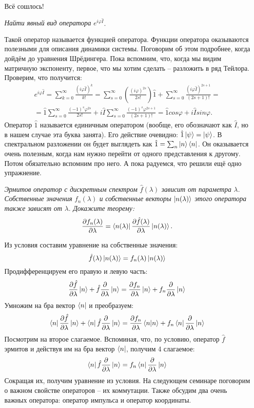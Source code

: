 Всё сошлось!
\newpage
{}
\begin{center}
\textit{Найти явный вид оператора $e^{i\varphi\hat I}$}.
\end{center}
Такой оператор называется функцией оператора. Функции оператора оказываются полезными для описания динамики системы. Поговорим об этом подробнее, когда дойдём до уравнения Шрёдингера. Пока вспомним, что, когда мы видим матричную экспоненту, первое, что мы хотим сделать -- разложить в ряд Тейлора. Проверим, что получится:
\begin{gather*}
    e^{i\varphi\hat I} = \sum\limits_{k=0}^{\infty} \frac{(i\varphi\hat I)^k}{k!} = \sum\limits_{s=0}^{\infty} \left(\frac{(i\varphi)^{2s}}{2s!}\right) \hat 1 + \sum\limits_{s=0}^{\infty} \frac{(i\varphi\hat I)^{2s+1}}{(2s+1)!} = \\
    =\hat 1 \sum\limits_{s=0}^{\infty} \frac{(-1)^s\varphi^{2s}}{2s!} + i\hat I \sum\limits_{s=0}^{\infty} \frac{(-1)^{s}\varphi^{2s+1}}{(2s+1)!} = \hat 1 cos\varphi + i\hat I sin \varphi.
\end{gather*}
Оператор $\hat{1}$ называется единичным оператором (вообще, его обозначают как $\hat{I}$, но в нашем случае эта буква занята). Его действие очевидно: $\hat{1}\ket{\psi} = \ket{\psi}$. В спектральном разложении он будет выглядеть как $\hat{1} = \sum_n \ket{n}\bra{n}$. Он оказывается очень полезным, когда нам нужно перейти от одного представления к другому. Потом обязательно вспомним про него. А пока радуемся, что решили ещё одно упражнение.
\begin{center}
\textit{Эрмитов оператор с дискретным спектром $\hat f(\lambda)$ зависит от параметра $\lambda$. Собственные значения $f_n(\lambda)$ и собственные векторы $\ket{n(\lambda)}$ этого оператора также зависят от $\lambda$. Докажите теорему:}
\[
\frac{\partial f_n(\lambda)}{\partial \lambda} = \bra{n(\lambda)} \frac{\partial \hat f(\lambda)}{\partial \lambda} \ket{n(\lambda)}.
\]
\end{center}

Из условия составим уравнение на собственные значения:
\[
\hat f(\lambda)\ket{n(\lambda)} = f_n(\lambda)\ket{n(\lambda)}
\]
Продифференцируем его правую и левую часть:
\[
\frac{\partial \hat f}{\partial \lambda}\ket{n} + \hat f\frac{\partial}{\partial \lambda}\ket{n} = \frac{\partial f_n}{\partial \lambda}\ket{n} + f_n\frac{\partial}{\partial \lambda}\ket{n}
\]
Умножим на бра вектор $\bra{n}$ и преобразуем:
\[
\bra{n}\frac{\partial \hat f}{\partial \lambda}\ket{n} + \bra{n}\hat f\frac{\partial}{\partial \lambda}\ket{n} = \frac{\partial f_n}{\partial \lambda}\braket{n} + f_n\bra{n}\frac{\partial}{\partial \lambda}\ket{n}
\]
Посмотрим на второе слагаемое. Вспоминая, что, по условию, оператор $\hat f$ эрмитов и действуя им на бра вектор $\bra{n}$, получим 4 слагаемое:
\[
\bra{n}\hat f\frac{\partial}{\partial \lambda}\ket{n} = f_n\bra{n}\frac{\partial}{\partial \lambda}\ket{n}
\]
Сокращая их, получим уравнение из условия.
На следующем семинаре поговорим о важном свойстве операторов -- их коммутации. Также обсудим два очень важных оператора: оператор импульса и оператор координаты.